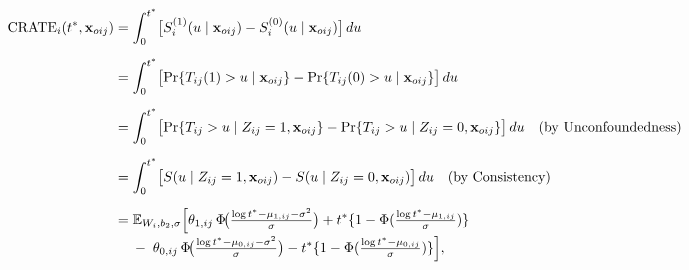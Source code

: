 \documentclass[aoas]{imsart}
\theoremstyle{plain}
\theoremstyle{definition}
\begin{document}











\begin{align*}
\text{CRATE}_i(t^*,\mathbf{x}_{oij})
&= \int_{0}^{t^*}\bigl[S_i^{(1)}(u\mid\mathbf{x}_{oij})
            - S_i^{(0)}(u\mid\mathbf{x}_{oij})\bigr]\,du \\[6pt]
&= \int_{0}^{t^*}\bigl[\Pr\{T_{ij}(1)>u\mid\mathbf{x}_{oij}\}
            - \Pr\{T_{ij}(0)>u\mid\mathbf{x}_{oij}\}\bigr]\,du \\[6pt]
&= \int_{0}^{t^*}\bigl[\Pr\{T_{ij}>u\mid Z_{ij}=1,\mathbf{x}_{oij}\}
            - \Pr\{T_{ij}>u\mid Z_{ij}=0,\mathbf{x}_{oij}\}\bigr]\,du 
   \quad(\text{by Unconfoundedness})\\[6pt]
&= \int_{0}^{t^*}\bigl[S(u\mid Z_{ij}=1,\mathbf{x}_{oij})
            - S(u\mid Z_{ij}=0,\mathbf{x}_{oij})\bigr]\,du
   \quad(\text{by Consistency})\\[6pt]
&= \mathbb{E}_{W_i,b_2,\sigma}\Bigl[
   \theta_{1,ij}\,\Phi\!\bigl(\tfrac{\log t^*-\mu_{1,ij}-\sigma^2}{\sigma}\bigr)
 + t^*\{1-\Phi(\tfrac{\log t^*-\mu_{1,ij}}{\sigma})\} \\[-2pt]
&\quad\;-\;\theta_{0,ij}\,\Phi\!\bigl(\tfrac{\log t^*-\mu_{0,ij}-\sigma^2}{\sigma}\bigr)
 - t^*\{1-\Phi(\tfrac{\log t^*-\mu_{0,ij}}{\sigma})\}
\Bigr],
\end{align*}
\end{document}
